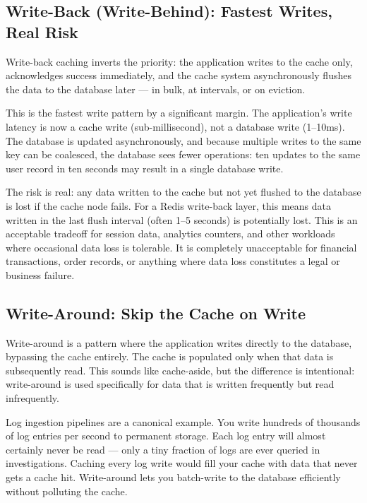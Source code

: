\documentclass[11pt,a4paper]{article}
\begin{document}
\subsection{Write-Back (Write-Behind): Fastest Writes, Real Risk}

Write-back caching inverts the priority: the application writes to the cache only, acknowledges success immediately, and the cache system asynchronously flushes the data to the database later --- in bulk, at intervals, or on eviction.

This is the fastest write pattern by a significant margin. The application's write latency is now a cache write (sub-millisecond), not a database write (1--10ms). The database is updated asynchronously, and because multiple writes to the same key can be coalesced, the database sees fewer operations: ten updates to the same user record in ten seconds may result in a single database write.

The risk is real: any data written to the cache but not yet flushed to the database is lost if the cache node fails. For a Redis write-back layer, this means data written in the last flush interval (often 1--5 seconds) is potentially lost. This is an acceptable tradeoff for session data, analytics counters, and other workloads where occasional data loss is tolerable. It is completely unacceptable for financial transactions, order records, or anything where data loss constitutes a legal or business failure.

\subsection{Write-Around: Skip the Cache on Write}

Write-around is a pattern where the application writes directly to the database, bypassing the cache entirely. The cache is populated only when that data is subsequently read. This sounds like cache-aside, but the difference is intentional: write-around is used specifically for data that is written frequently but read infrequently.

Log ingestion pipelines are a canonical example. You write hundreds of thousands of log entries per second to permanent storage. Each log entry will almost certainly never be read --- only a tiny fraction of logs are ever queried in investigations. Caching every log write would fill your cache with data that never gets a cache hit. Write-around lets you batch-write to the database efficiently without polluting the cache.
\end{document}
